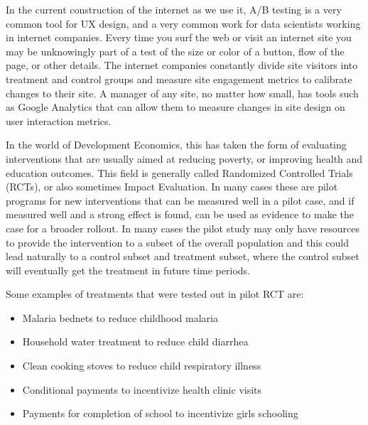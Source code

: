 \documentclass[letterpaper,10pt,english]{jupyterBook}
\begin{document}
\sphinxAtStartPar
In the current construction of the internet as we use it, A/B testing is a very common tool for UX design, and a very common work for data scientists working in internet companies.  Every time you surf the web or visit an internet site you may be unknowingly part of a test of the size or color of a button, flow of the page, or other details. The internet companies constantly divide site visitors into treatment and control groups and measure site engagement metrics to calibrate changes to their site.  A manager of any site, no matter how small, has tools such as Google Analytics that can allow them to measure changes in site design on user interaction metrics.

\sphinxAtStartPar
In the world of Development Economics, this has taken the form of evaluating interventions that are usually aimed at reducing poverty, or improving health and education outcomes. This field is generally called Randomized Controlled Trials (RCTs), or also sometimes Impact Evaluation.  In many cases these are pilot programs for new interventions that can be measured well in a pilot case, and if measured well and a strong effect is found, can be used as evidence to make the case for a broader rollout. In many cases the pilot study may only have resources to provide the intervention to a subset of the overall population and this could lead naturally to a control subset and treatment subset, where the control subset will eventually get the treatment in future time periods.

\sphinxAtStartPar
Some examples of treatments that were tested out in pilot RCT are:
\begin{itemize}
\item {} 
\sphinxAtStartPar
Malaria bednets to reduce childhood malaria

\item {} 
\sphinxAtStartPar
Household water treatment to reduce child diarrhea

\item {} 
\sphinxAtStartPar
Clean cooking stoves to reduce child respiratory illness

\item {} 
\sphinxAtStartPar
Conditional payments to incentivize health clinic visits

\item {} 
\sphinxAtStartPar
Payments for completion of school to incentivize girls schooling

\end{itemize}
\end{document}
